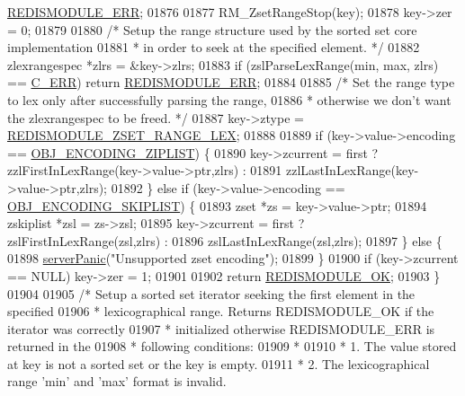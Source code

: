 \begin{DoxyCode}
{{{      \hyperlink{redismodule_8h_a3df6f5bd5247289e66f44437a7cddd49}{REDISMODULE\_ERR};
01876 
01877     RM\_ZsetRangeStop(key);
01878     key->zer = 0;
01879 
01880     \textcolor{comment}{/* Setup the range structure used by the sorted set core implementation}
01881 \textcolor{comment}{     * in order to seek at the specified element. */}
01882     zlexrangespec *zlrs = &key->zlrs;
01883     \textcolor{keywordflow}{if} (zslParseLexRange(min, max, zlrs) == \hyperlink{server_8h_af98ac28d5f4d23d7ed5985188e6fb7d1}{C\_ERR}) \textcolor{keywordflow}{return} 
      \hyperlink{redismodule_8h_a3df6f5bd5247289e66f44437a7cddd49}{REDISMODULE\_ERR};
01884 
01885     \textcolor{comment}{/* Set the range type to lex only after successfully parsing the range,}
01886 \textcolor{comment}{     * otherwise we don't want the zlexrangespec to be freed. */}
01887     key->ztype = \hyperlink{module_8c_a36d7bac3b2781ba9b076ee6feee141a1}{REDISMODULE\_ZSET\_RANGE\_LEX};
01888 
01889     \textcolor{keywordflow}{if} (key->value->encoding == \hyperlink{server_8h_aabf064ede983103f1fd0df2086e84eee}{OBJ\_ENCODING\_ZIPLIST}) \{
01890         key->zcurrent = first ? zzlFirstInLexRange(key->value->ptr,zlrs) :
01891                                 zzlLastInLexRange(key->value->ptr,zlrs);
01892     \} \textcolor{keywordflow}{else} \textcolor{keywordflow}{if} (key->value->encoding == \hyperlink{server_8h_acfb35db5cb30ed113ed23aeb1a224c4c}{OBJ\_ENCODING\_SKIPLIST}) \{
01893         zset *zs = key->value->ptr;
01894         zskiplist *zsl = zs->zsl;
01895         key->zcurrent = first ? zslFirstInLexRange(zsl,zlrs) :
01896                                 zslLastInLexRange(zsl,zlrs);
01897     \} \textcolor{keywordflow}{else} \{
01898         \hyperlink{server_8h_a11cc378e7778a830b41240578de3b204}{serverPanic}(\textcolor{stringliteral}{"Unsupported zset encoding"});
01899     \}
01900     \textcolor{keywordflow}{if} (key->zcurrent == NULL) key->zer = 1;
01901 
01902     \textcolor{keywordflow}{return} \hyperlink{redismodule_8h_a1bc5bfd69abcd378ff52c640adc5418d}{REDISMODULE\_OK};
01903 \}
01904 
01905 \textcolor{comment}{/* Setup a sorted set iterator seeking the first element in the specified}
01906 \textcolor{comment}{ * lexicographical range. Returns REDISMODULE\_OK if the iterator was correctly}
01907 \textcolor{comment}{ * initialized otherwise REDISMODULE\_ERR is returned in the}
01908 \textcolor{comment}{ * following conditions:}
01909 \textcolor{comment}{ *}
01910 \textcolor{comment}{ * 1. The value stored at key is not a sorted set or the key is empty.}
01911 \textcolor{comment}{ * 2. The lexicographical range 'min' and 'max' format is invalid.}
}}}
\end{DoxyCode}
